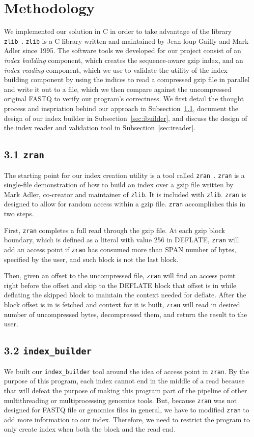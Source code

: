 \documentclass[unnumsec,webpdf,contemporary,large]{oup-authoring-template}
\newcommand{\zlib}{\texttt{zlib}\xspace}
\newcommand{\zran}{\texttt{zran}\xspace}
\newcommand{\ibuilder}{\texttt{index\_builder}\xspace}
\newcommand{\gzip}{gzip\xspace}
\begin{document}
\section{Methodology}
We implemented our solution in C in order to take advantage of the library
\zlib~\cite{zlib}. \zlib is a C library written and maintained by Jean-loup
Gailly and Mark Adler since 1995.
The software tools we developed for our project consist of an \emph{index
building} component, which creates the sequence-aware \gzip index, and an
\emph{index reading} component, which we use to validate the utility of the
index building component by using the indices to read a compressed gzip file in
parallel and write it out to a file, which we then compare against the
uncompressed original FASTQ to verify our program's correctness. We first detail
the thought process and inspriation behind our approach in
Subsection~\ref{sec:zran}, document the design of our index builder in
Subsection~\ref{sec:ibuilder}, and discuss the design of the index reader and validation
tool in Subsection~\ref{sec:ireader}.

\subsection{3.1 \zran}
\label{sec:zran}

The starting point for our index creation utility is a tool called
\zran~\cite{zran}. \zran
is a single-file demonstration of how to build an index over a \gzip file
written by Mark Adler, co-creator and maintainer of \zlib. It is included with
\zlib. \zran is designed to allow for random access within a \gzip file. \zran
accomplishes this in two steps. 

First, \zran completes a full read through the \gzip file. At each \gzip block boundary, which is defined as a literal with value 256 in DEFLATE, \zran will add an access point if \zran has consumed more than SPAN number of bytes, specified by the user, and such block is not the last block. 

Then, given an offset to the uncompressed file, \zran will find an access point right before the offset and skip to the DEFLATE block that offset is in while deflating the skipped block to maintain the context needed for deflate. After the block offset is in is fetched and context for it is built, \zran will read in desired number of uncompressed bytes, decompressed them, and return the result to the user. 

\subsection{3.2 \ibuilder}
We built our \ibuilder tool around the idea of access point in \zran. By the purpose of this program, each index cannot end in the middle of a read because that will defeat the purpose of making this program part of the pipeline of other multithreading or multiprocessing genomics tools. But, because \zran was not designed for FASTQ file or genomics files in general, we have to modified \zran to add more information to our index. Therefore, we need to restrict the program to only create index when both the block and the read end. 
\end{document}
